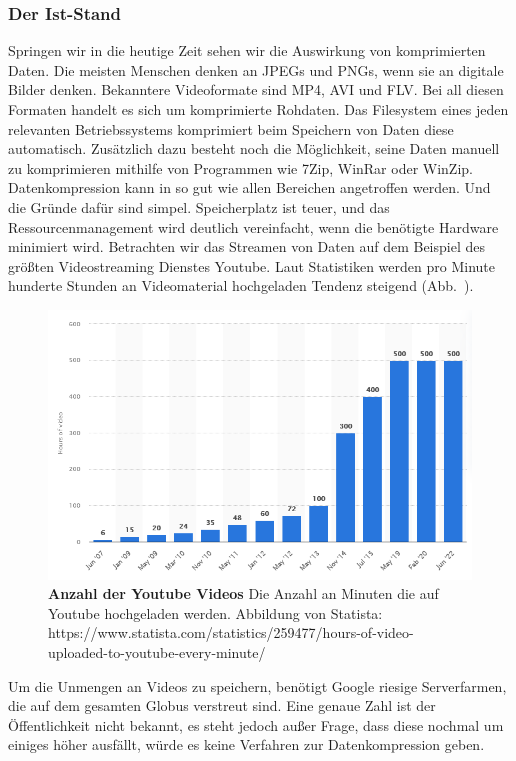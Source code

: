 \subsubsection*{Der Ist-Stand}
Springen wir in die heutige Zeit sehen wir die Auswirkung von komprimierten Daten.
Die meisten Menschen denken an JPEGs und PNGs, wenn sie an digitale Bilder denken.
Bekanntere Videoformate sind MP4, AVI und FLV.
Bei all diesen Formaten handelt es sich um komprimierte Rohdaten.
Das Filesystem eines jeden relevanten Betriebssystems komprimiert beim Speichern von Daten diese automatisch.
Zusätzlich dazu besteht noch die Möglichkeit, seine Daten manuell zu komprimieren mithilfe von Programmen wie 7Zip, WinRar oder WinZip.
Datenkompression kann in so gut wie allen Bereichen angetroffen werden.
Und die Gründe dafür sind simpel.
Speicherplatz ist teuer, und das Ressourcenmanagement wird deutlich vereinfacht, wenn die benötigte Hardware minimiert wird.
Betrachten wir das Streamen von Daten auf dem Beispiel des größten Videostreaming Dienstes Youtube.
Laut Statistiken werden pro Minute hunderte Stunden an Videomaterial hochgeladen Tendenz steigend (Abb.~).
\begin{figure}[htb]
  \centering  
  \includegraphics[scale=0.8]{Bilder/youtube_statistik.png}
  \caption[Youtube Statistik]{\textbf{Anzahl der Youtube Videos} Die Anzahl an Minuten die auf Youtube hochgeladen werden.
  Abbildung von Statista: https://www.statista.com/statistics/259477/hours-of-video-uploaded-to-youtube-every-minute/ }
  \label{fig:youtube}
\end{figure}
Um die Unmengen an Videos zu speichern, benötigt Google riesige Serverfarmen, die auf dem gesamten Globus verstreut sind.
Eine genaue Zahl ist der Öffentlichkeit nicht bekannt, es steht jedoch außer Frage, dass diese nochmal um einiges höher ausfällt, würde es keine Verfahren zur Datenkompression geben. \newline


